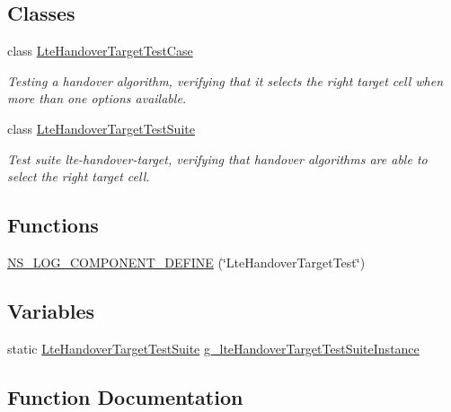 \subsection*{Classes}
\begin{DoxyCompactItemize}
\item 
class \hyperlink{classLteHandoverTargetTestCase}{Lte\+Handover\+Target\+Test\+Case}
\begin{DoxyCompactList}\small\item\em Testing a handover algorithm, verifying that it selects the right target cell when more than one options available. \end{DoxyCompactList}\item 
class \hyperlink{classLteHandoverTargetTestSuite}{Lte\+Handover\+Target\+Test\+Suite}
\begin{DoxyCompactList}\small\item\em Test suite {\ttfamily lte-\/handover-\/target}, verifying that handover algorithms are able to select the right target cell. \end{DoxyCompactList}\end{DoxyCompactItemize}
\subsection*{Functions}
\begin{DoxyCompactItemize}
\item 
\hyperlink{test-lte-handover-target_8cc_af1c59835431bf381973ffc5e8e650522}{N\+S\+\_\+\+L\+O\+G\+\_\+\+C\+O\+M\+P\+O\+N\+E\+N\+T\+\_\+\+D\+E\+F\+I\+NE} (\char`\"{}Lte\+Handover\+Target\+Test\char`\"{})
\end{DoxyCompactItemize}
\subsection*{Variables}
\begin{DoxyCompactItemize}
\item 
static \hyperlink{classLteHandoverTargetTestSuite}{Lte\+Handover\+Target\+Test\+Suite} \hyperlink{test-lte-handover-target_8cc_af5aedd2746d3dcccce502feec37981ad}{g\+\_\+lte\+Handover\+Target\+Test\+Suite\+Instance}
\end{DoxyCompactItemize}


\subsection{Function Documentation}
